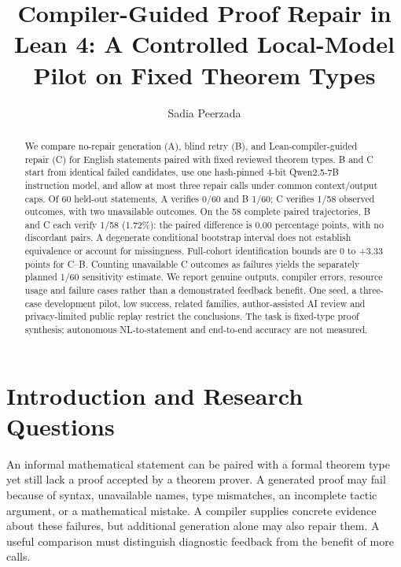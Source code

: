 \documentclass[runningheads,a4paper]{llncs}
\begin{document}
\title{Compiler-Guided Proof Repair in Lean 4: A Controlled Local-Model Pilot on Fixed Theorem Types}
\author{Sadia Peerzada}
\institute{}
\maketitle

\begin{abstract}
We compare no-repair generation (A), blind retry (B), and Lean-compiler-guided
repair (C) for English statements paired with fixed reviewed theorem types.
B and C start from identical failed candidates, use one hash-pinned 4-bit
Qwen2.5-7B instruction model, and allow at most three repair calls under common
context/output caps. Of 60 held-out statements, A verifies 0/60 and B 1/60;
C verifies 1/58 observed outcomes, with two unavailable outcomes. On the 58
complete paired trajectories, B and C each verify 1/58 (1.72\%): the paired
difference is 0.00 percentage points, with no discordant pairs. A degenerate
conditional bootstrap interval does not establish equivalence or account for
missingness. Full-cohort identification bounds are 0 to +3.33 points for C--B.
Counting unavailable C outcomes as failures yields the separately planned
1/60 sensitivity estimate. We report genuine outputs, compiler errors, resource
usage and failure cases rather than a demonstrated feedback benefit. One seed,
a three-case development pilot, low success, related families, author-assisted
AI review and privacy-limited public replay restrict the conclusions. The task
is fixed-type proof synthesis; autonomous NL-to-statement and end-to-end accuracy
are not measured.
\end{abstract}

\section{Introduction and Research Questions}
An informal mathematical statement can be paired with a formal theorem type
yet still lack a proof accepted by a theorem prover. A generated proof may fail
because of syntax, unavailable names, type mismatches, an incomplete tactic
argument, or a mathematical mistake. A compiler supplies concrete evidence about
these failures, but additional generation alone may also repair them. A useful
comparison must distinguish diagnostic feedback from the benefit of more calls.
\end{document}
